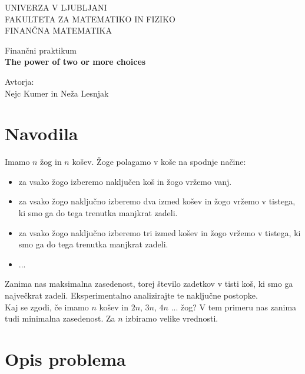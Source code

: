 \documentclass[a4paper, 11pt]{article}
\begin{document}
\begin{titlepage}
    \begin{center}
        \LARGE
        UNIVERZA V LJUBLJANI\\
        FAKULTETA ZA MATEMATIKO IN FIZIKO\\
        FINANČNA MATEMATIKA\\

        \vspace*{5cm}
        
        Finančni praktikum\\
        \huge
        \textbf{The power of two or more choices}

        \vspace*{6cm}

        \Large
        Avtorja:\\
        Nejc Kumer in Neža Lesnjak
    \end{center}
\end{titlepage}

\tableofcontents
\pagebreak

\section{Navodila}

Imamo $n$ žog in $n$ košev. Žoge polagamo v koše na spodnje načine:

\begin{itemize}
    \item za vsako žogo izberemo naključen koš in žogo vržemo vanj.
    \item za vsako žogo naključno izberemo dva izmed košev in žogo vržemo v tistega, 
    ki smo ga do tega trenutka manjkrat zadeli.
    \item za vsako žogo naključno izberemo tri izmed košev in žogo vržemo v tistega, 
    ki smo ga do tega trenutka manjkrat zadeli.
    \item ...
\end{itemize}

Zanima nas maksimalna zasedenost, torej število zadetkov v tisti koš, ki smo ga največkrat zadeli.
Eksperimentalno analizirajte te naključne postopke.\\
Kaj se zgodi, če imamo $n$ košev in $2n$, $3n$, $4n$ ... žog?
V tem primeru nas zanima tudi minimalna zasedenost.
Za $n$ izbiramo velike vrednosti.

\section{Opis problema}
\end{document}

